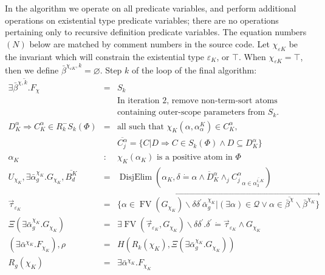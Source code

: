 \documentclass{article}
\newcommand{\tmop}[1]{\ensuremath{\operatorname{#1}}}
\newcommand{\tmverbatim}[1]{{\ttfamily{#1}}}
\begin{document}
In the algorithm we operate on all predicate variables, and perform additional
operations on existential type predicate variables; there are no operations
pertaining only to recursive definition predicate variables. The equation
numbers $(N)$ below are matched by comment numbers \tmverbatim{(* N *)} in the
source code. Let $\chi_{\varepsilon K}$ be the invariant which will constrain
the existential type $\varepsilon_K$, or $\top$. When $\chi_{\varepsilon K} =
\top$, then we define $\bar{\beta}^{\chi_{\varepsilon K}, k} = \varnothing$.
Step $k$ of the loop of the final algorithm:
\begin{eqnarray}
  \overline{\exists \bar{\beta}^{\chi, k} .F_{\chi}} & = & S_k \nonumber\\
  &  & \text{In iteration 2, remove non-term-sort atoms} \nonumber\\
  &  & \text{containing outer-scope parameters from } S_k . \nonumber\\
  D_K^{\alpha} \Rightarrow C_K^{\alpha} \in R_k^- S_k (\Phi) & = & \text{all
  such that } \chi_K (\alpha, \alpha_{\alpha}^K) \in C_K^{\alpha}, \\
  &  & \overline{C^{\alpha}_j} = \{ C | D \Rightarrow C \in S_k (\Phi) \wedge
  D \subseteq D^{\alpha}_K \} \nonumber\\
  \alpha_K & : & \chi_K (\alpha_K) \text{ is a positive atom in } \Phi
  \nonumber\\
  U_{\chi_K}, \exists \bar{\alpha}^{\chi_K}_g .G_{\chi_K}, \overline{B_d^K} &
  = & \tmop{DisjElim} \left( \alpha_K, \overline{\delta \dot{=} \alpha \wedge
  D^{\alpha}_K \wedge_j C^{\alpha}_j}_{\alpha \in \overline{\alpha_3^{i, K}}}
  \right) \\
  \vec{\tau}_{\varepsilon_K} & = & \overrightarrow{\{ \alpha \in \tmop{FV}
  (G_{\chi_K}) \backslash \delta \delta^{\prime} \bar{\alpha}^{\chi_K}_g |
  (\exists \alpha) \in \mathcal{Q} \vee \alpha \in
  \overline{\bar{\beta}^{\chi}} \backslash \bar{\beta}^{\chi_K} \}}
  \nonumber\\
  \Xi (\exists \bar{\alpha}^{\chi_K}_g .G_{\chi_K}) & = & \exists \tmop{FV}
  (\vec{\tau}_{\varepsilon_K}, G_{\chi_K}) \backslash \delta \delta^{\prime} .
  \delta^{\prime} \dot{=} \vec{\tau}_{\varepsilon_K} \wedge G_{\chi_K}
  \nonumber\\
  (\exists \bar{\alpha}^{\chi_K} .F_{\chi_K}), \rho & = & H (R_k (\chi_K), \Xi
  (\exists \bar{\alpha}_g^{\chi_K} .G_{\chi_K}))  \label{Rg}\\
  R_g (\chi_K) & = & \exists \bar{\alpha}^{\chi_K} .F_{\chi_K} \nonumber\\

\end{eqnarray}
\end{document}
